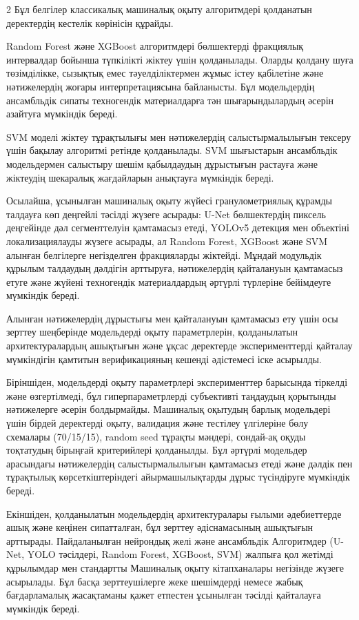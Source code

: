 \begin{multicols}{2}
Бұл белгілер классикалық машиналық оқыту алгоритмдері қолданатын
деректердің кестелік көрінісін құрайды.

Random Forest және XGBoost алгоритмдері бөлшектерді фракциялық
интервалдар бойынша түпкілікті жіктеу үшін қолданылады. Оларды қолдану
шуға төзімділікке, сызықтық емес тәуелділіктермен жұмыс істеу қабілетіне
және нәтижелердің жоғары интерпретациясына байланысты. Бұл модельдердің
ансамбльдік сипаты техногендік материалдарға тән шығарындылардың әсерін
азайтуға мүмкіндік береді.

SVM моделі жіктеу тұрақтылығы мен нәтижелердің салыстырмалылығын тексеру
үшін бақылау алгоритмі ретінде қолданылады. SVM шығыстарын ансамбльдік
модельдермен салыстыру шешім қабылдаудың дұрыстығын растауға және
жіктеудің шекаралық жағдайларын анықтауға мүмкіндік береді.

Осылайша, ұсынылған машиналық оқыту жүйесі гранулометриялық құрамды
талдауға көп деңгейлі тәсілді жүзеге асырады: U-Net бөлшектердің пиксель
деңгейінде дәл сегменттелуін қамтамасыз етеді, YOLOv5 детекция мен
объектіні локализациялауды жүзеге асырады, ал Random Forest, XGBoost
және SVM алынған белгілерге негізделген фракцияларды жіктейді. Мұндай
модульдік құрылым талдаудың дәлдігін арттыруға, нәтижелердің қайталануын
қамтамасыз етуге және жүйені техногендік материалдардың әртүрлі
түрлеріне бейімдеуге мүмкіндік береді.

Алынған нәтижелердің дұрыстығы мен қайталануын қамтамасыз ету үшін осы
зерттеу шеңберінде модельдерді оқыту параметрлерін, қолданылатын
архитектуралардың ашықтығын және ұқсас деректерде эксперименттерді
қайталау мүмкіндігін қамтитын верификацияның кешенді әдістемесі іске
асырылды.

Біріншіден, модельдерді оқыту параметрлері эксперименттер барысында
тіркелді және өзгертілмеді, бұл гиперпараметрлерді субъективті таңдаудың
қорытынды нәтижелерге әсерін болдырмайды. Машиналық оқытудың барлық
модельдері үшін бірдей деректерді оқыту, валидация және тестілеу
үлгілеріне бөлу схемалары (70/15/15), random seed тұрақты мәндері,
сондай-ақ оқуды тоқтатудың бірыңғай критерийлері қолданылды. Бұл әртүрлі
модельдер арасындағы нәтижелердің салыстырмалылығын қамтамасыз етеді
және дәлдік пен тұрақтылық көрсеткіштеріндегі айырмашылықтарды дұрыс
түсіндіруге мүмкіндік береді.

Екіншіден, қолданылатын модельдердің архитектуралары ғылыми әдебиеттерде
ашық және кеңінен сипатталған, бұл зерттеу әдіснамасының ашықтығын
арттырады. Пайдаланылған нейрондық желі және ансамбльдік Алгоритмдер
(U-Net, YOLO тәсілдері, Random Forest, XGBoost, SVM) жалпыға қол жетімді
құрылымдар мен стандартты Машиналық оқыту кітапханалары негізінде жүзеге
асырылады. Бұл басқа зерттеушілерге жеке шешімдерді немесе жабық
бағдарламалық жасақтаманы қажет етпестен ұсынылған тәсілді қайталауға
мүмкіндік береді.


\end{multicols}
